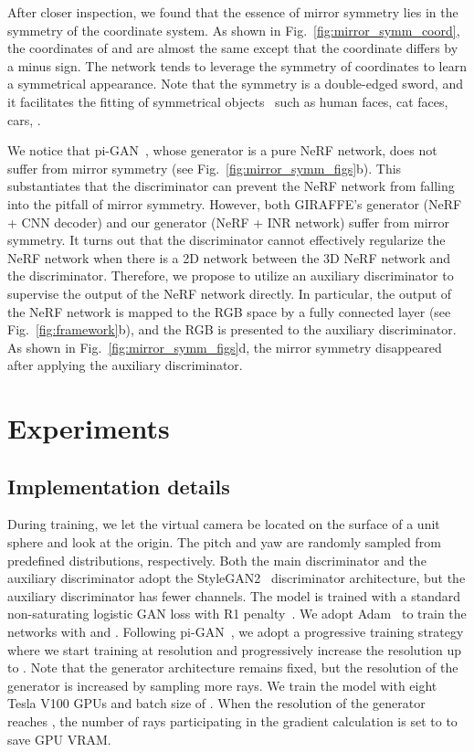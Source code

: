 \documentclass[10pt,twocolumn,letterpaper]{article}
\begin{document}
After closer inspection, we found that the essence of mirror symmetry lies in the symmetry of the coordinate system. As shown in Fig.~\ref{fig:mirror_symm_coord}, the coordinates of  and  are almost the same except that the  coordinate differs by a minus sign. The network tends to leverage the symmetry of coordinates to learn a symmetrical appearance. Note that the symmetry is a double-edged sword, and it facilitates the fitting of symmetrical objects~\cite{wu2020Unsupervised,pan20212D} such as human faces, cat faces, cars, \etc.

We notice that pi-GAN~\cite{chan2021piGAN}, whose generator is a pure NeRF network, does not suffer from mirror symmetry (see Fig.~\ref{fig:mirror_symm_figs}b). This substantiates that the discriminator can prevent the NeRF network from falling into the pitfall of mirror symmetry. However, both GIRAFFE's generator (NeRF + CNN decoder) and our generator (NeRF + INR network) suffer from mirror symmetry. It turns out that the discriminator cannot effectively regularize the NeRF network when there is a 2D network between the 3D NeRF network and the discriminator. Therefore, we propose to utilize an auxiliary discriminator to supervise the output of the NeRF network directly. In particular, the output of the NeRF network is mapped to the RGB space by a fully connected layer (see Fig.~\ref{fig:framework}b), and the RGB is presented to the auxiliary discriminator. As shown in Fig.~\ref{fig:mirror_symm_figs}d, the mirror symmetry disappeared after applying the auxiliary discriminator.









\section{Experiments}

\subsection{Implementation details}

During training, we let the virtual camera be located on the surface of a unit sphere and look at the origin. The pitch and yaw are randomly sampled from predefined distributions, respectively. Both the main discriminator and the auxiliary discriminator adopt the StyleGAN2~\cite{karras2019Analyzing} discriminator architecture, but the auxiliary discriminator has fewer channels. The model is trained with a standard non-saturating logistic GAN loss with R1 penalty~\cite{mescheder2018Which}. We adopt Adam~\cite{kingma2014Adam} to train the networks with  and . Following pi-GAN~\cite{chan2021piGAN}, we adopt a progressive training strategy where we start training at  resolution and progressively increase the resolution up to . Note that the generator architecture remains fixed, but the resolution of the generator is increased by sampling more rays. We train the model with eight Tesla V100 GPUs and batch size of . When the resolution of the generator reaches , the number of rays participating in the gradient calculation is set to  to save GPU VRAM.
\end{document}

